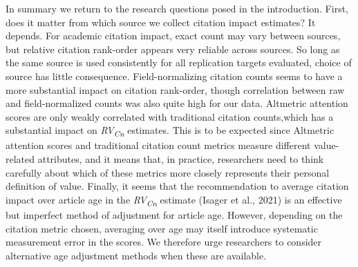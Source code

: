 \documentclass[
  english,
  man,floatsintext]{apa6}
\begin{document}
In summary we return to the research questions posed in the introduction. First, does it matter from which source we collect citation impact estimates? It depends. For academic citation impact, exact count may vary between sources, but relative citation rank-order appears very reliable across sources. So long as the same source is used consistently for all replication targets evaluated, choice of source has little consequence. Field-normalizing citation counts seems to have a more substantial impact on citation rank-order, though correlation between raw and field-normalized counts was also quite high for our data. Altmetric attention scores are only weakly correlated with traditional citation counts,which has a substantial impact on \emph{RV\textsubscript{Cn}} estimates. This is to be expected since Altmetric attention scores and traditional citation count metrics measure different value-related attributes, and it means that, in practice, researchers need to think carefully about which of these metrics more closely represents their personal definition of value. Finally, it seems that the recommendation to average citation impact over article age in the \emph{RV\textsubscript{Cn}} estimate (Isager et al., 2021) is an effective but imperfect method of adjustment for article age. However, depending on the citation metric chosen, averaging over age may itself introduce systematic measurement error in the scores. We therefore urge researchers to consider alternative age adjustment methods when these are available.
\end{document}
